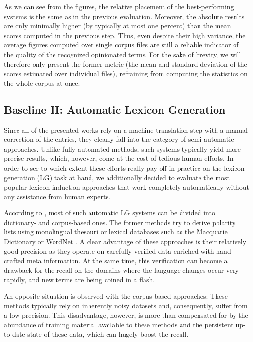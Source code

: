 As we can see from the figures, the relative placement of the
best-performing systems is the same as in the previous evaluation.
Moreover, the absolute results are only minimally higher (by typically
at most one percent) than the mean scores computed in the previous
step.  Thus, even despite their high variance, the average figures
computed over single corpus files are still a reliable indicator of
the quality of the recognized opinionated terms.  For the sake of
brevity, we will therefore only present the former metric (the mean
and standard deviation of the scores estimated over individual files),
refraining from computing the statistics on the whole corpus at once.

\subsection{Baseline II: Automatic Lexicon Generation}

Since all of the presented works rely on a machine translation step
with a manual correction of the entries, they clearly fall into the
category of semi-automatic approaches.  Unlike fully automated
methods, such systems typically yield more precise results, which,
however, come at the cost of tedious human efforts.  In order to see
to which extent these efforts really pay off in practice on the
lexicon generation (LG) task at hand, we additionally decided to
evaluate the most popular lexicon induction approaches that work
completely automatically without any assistance from human experts.

According to \citet[p. 79]{Liu:12}, most of such automatic LG systems
can be divided into dictionary- and corpus-based ones.  The former
methods try to derive polarity lists using monolingual thesauri or
lexical databases such as the Macquarie Dictionary \cite{Bernard:86}
or WordNet \cite{Miller:95}.  A clear advantage of these approaches is
their relatively good precision as they operate on carefully verified
data enriched with hand-crafted meta information.  At the same time,
this verification can become a drawback for the recall on the domains
where the language changes occur very rapidly, and new terms are being
coined in a flash.

An opposite situation is observed with the corpus-based approaches:
These methods typically rely on inherently noisy datasets and,
consequently, suffer from a low precision.  This disadvantage,
however, is more than compensated for by the abundance of training
material available to these methods and the persistent up-to-date
state of these data, which can hugely boost the recall.

